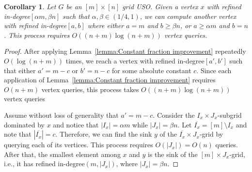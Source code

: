 \documentclass[a4paper,10pt]{article}
\newtheorem{corollary}{Corollary}
\newcommand{\indegree}{refined in-degree\xspace}
\begin{document}
\begin{corollary}
Let $G$ be an $[m]\times[n]$ grid USO. 
Given a vertex $x$ with \indegree $[\alpha m, \beta n]$ such that $\alpha, \beta \in (1/4,1)$, we can compute another vertex with \indegree $[a,b]$ where either $a = m$ and $b \geq \beta n$, or $a \geq \alpha m$ and $b  = n$. This process requires $O((n + m) \log (n+m))$ vertex queries.
\end{corollary}
\begin{proof}
After applying Lemma~\ref{lemma:Constant fraction improvement} repeatedly $O(\log(n + m))$ times, we reach a vertex with \indegree $[a', b']$ such that either $a' = m - c$ or $b' = n- c$ for some absolute constant $c$. 
Since each application of Lemma~\ref{lemma:Constant fraction improvement} requires $O(n+m)$ vertex queries, this process takes $O((n + m) \log (n+m))$ vertex queries

Assume without loss of generality that $a' = m-c$.
Consider the  $I_x\times J_x$-subgrid dominated by $x$ and 
notice that $|I_x| = \alpha m$ while $|J_x| = \beta n$. 
Let $\overline{I_x} = [m] \setminus I_x$ and note that $|\overline{I_x}| = c$. Therefore, we can find the sink $y$ of the $\overline{I_x}\times J_x$-grid by querying each of its vertices. This process requires $O(|J_x|) = O(n)$ queries.  After that, the smallest element among $x$ and $y$ is the sink of the $[m]\times J_x$-grid, i.e., it has \indegree $(m, |J_x|)$, where $|J_x|  = \beta n$.
\end{proof}







\end{document}
